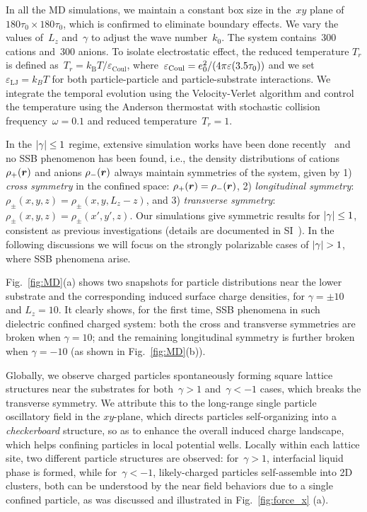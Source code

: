 In all the MD simulations, we maintain a constant box size in the~$xy$ plane of~$180\tau_0 \times 180\tau_0$, which is confirmed to eliminate boundary effects.
We vary the values of~$L_z$ and~$\gamma$ to adjust the wave number~$k_0$. 
The system contains~$300$ cations and~$300$ anions.
To isolate electrostatic effect, the reduced temperature $T_r$ is defined as~$T_r =k_{\mathrm B}T/\varepsilon_{\mathrm{Coul}}$, where~$\varepsilon_{\mathrm{Coul}} = e_0^2/(4 \pi \varepsilon (3.5 \tau_0))$ and we set~$\varepsilon_{\mathrm{LJ}} = k_B T$ for both particle-particle and particle-substrate interactions. 
We integrate the temporal evolution using the Velocity-Verlet algorithm and control the temperature using the Anderson thermostat with stochastic collision frequency~$\omega = 0.1$ and reduced temperature~$T_r = 1$.

In the $\lvert\gamma\rvert\leq 1$ regime, extensive simulation works have been done recently~\cite{liang2020harmonic,yuan2021particle} and no SSB phenomenon has been found, i.e., the density distributions of cations $\rho_{+}(\boldsymbol{r})$ and anions $\rho_{-}(\boldsymbol{r})$  always maintain symmetries of the system, given by 1) \emph{cross symmetry} in the confined space: $\rho_{+}(\boldsymbol{r})=\rho_{-}(\boldsymbol{r})$, 2) \emph{longitudinal symmetry}: $\rho_{\pm}(x,y,z)=\rho_{\pm}(x,y,L_z-z)$, and 3) \emph{transverse symmetry}: $\rho_{\pm}(x,y,z)=\rho_{\pm}(x',y',z)$. 
Our simulations give symmetric results for  $\lvert\gamma\rvert\leq 1$, consistent as previous investigations (details are documented in SI~\cite{SI}). 
In the following discussions we will focus on the strongly polarizable cases of $\lvert\gamma\rvert>1$, where SSB phenomena arise.

Fig.~\ref{fig:MD}(a) shows two snapshots for particle distributions near the lower substrate and the corresponding induced surface charge densities, for $\gamma=\pm10$ and $L_z=10$. It clearly shows, for the first time, SSB phenomena in such dielectric confined charged system: both the cross and transverse symmetries are broken when $\gamma=10$; and the remaining longitudinal symmetry is further broken when $\gamma=-10$ (as shown in Fig.~\ref{fig:MD}(b)).

Globally, we observe charged particles spontaneously forming square lattice structures near the substrates for both~$\gamma > 1$ and~$\gamma < -1$ cases, which breaks the transverse symmetry. 
We attribute this to the long-range single particle oscillatory field in the $xy$-plane, which directs particles self-organizing into a \emph{checkerboard} structure, so as to enhance the overall induced charge landscape, which helps confining particles in local potential wells.
Locally within each lattice site, two different particle structures are observed: for~$\gamma >1$, interfacial liquid phase is formed, while for~$\gamma < -1$, likely-charged particles self-assemble into 2D clusters, both can be understood by the near field behaviors due to a single confined particle, as was discussed and illustrated in Fig.~\ref{fig:force_x} (a).

